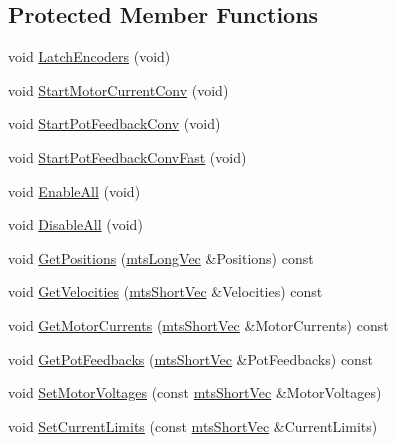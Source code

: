 \subsection*{Protected Member Functions}
\begin{DoxyCompactItemize}
\item 
void \hyperlink{classmts_lo_po_mo_co_aef21dadb70636f34c3674f5f1bc3bd53}{Latch\-Encoders} (void)
\item 
void \hyperlink{classmts_lo_po_mo_co_a46a1f51a4123956838720c4dca50aeeb}{Start\-Motor\-Current\-Conv} (void)
\item 
void \hyperlink{classmts_lo_po_mo_co_a3181fa8f81a530e20de55adbcb09a50e}{Start\-Pot\-Feedback\-Conv} (void)
\item 
void \hyperlink{classmts_lo_po_mo_co_a18238e257128dff22573950fbcabbe85}{Start\-Pot\-Feedback\-Conv\-Fast} (void)
\item 
void \hyperlink{classmts_lo_po_mo_co_a45c547240bba97cd4358dfe5c0484542}{Enable\-All} (void)
\item 
void \hyperlink{classmts_lo_po_mo_co_a540842d14cc67089cd0dab1579b5b242}{Disable\-All} (void)
\item 
void \hyperlink{classmts_lo_po_mo_co_aa2037e3920acbb529e2e3a163d52d792}{Get\-Positions} (\hyperlink{mts_vector_8h_a3e011934ab1b5774f640a7bb70d9a672}{mts\-Long\-Vec} \&Positions) const 
\item 
void \hyperlink{classmts_lo_po_mo_co_aa6289b399da0bf7f536e90a811600263}{Get\-Velocities} (\hyperlink{mts_vector_8h_a70974166b1900882680f3002b69e11c5}{mts\-Short\-Vec} \&Velocities) const 
\item 
void \hyperlink{classmts_lo_po_mo_co_a7ba6e1e29a54575d4511c487ace79077}{Get\-Motor\-Currents} (\hyperlink{mts_vector_8h_a70974166b1900882680f3002b69e11c5}{mts\-Short\-Vec} \&Motor\-Currents) const 
\item 
void \hyperlink{classmts_lo_po_mo_co_ac5cc00b1a930711fce5cf1cd274f922d}{Get\-Pot\-Feedbacks} (\hyperlink{mts_vector_8h_a70974166b1900882680f3002b69e11c5}{mts\-Short\-Vec} \&Pot\-Feedbacks) const 
\item 
void \hyperlink{classmts_lo_po_mo_co_a039fdbe3af9ab8e06d3bd6e2156f441a}{Set\-Motor\-Voltages} (const \hyperlink{mts_vector_8h_a70974166b1900882680f3002b69e11c5}{mts\-Short\-Vec} \&Motor\-Voltages)
\item 
void \hyperlink{classmts_lo_po_mo_co_afff8ede1c86fb740cf8bf123363263bc}{Set\-Current\-Limits} (const \hyperlink{mts_vector_8h_a70974166b1900882680f3002b69e11c5}{mts\-Short\-Vec} \&Current\-Limits)

\end{DoxyCompactItemize}
